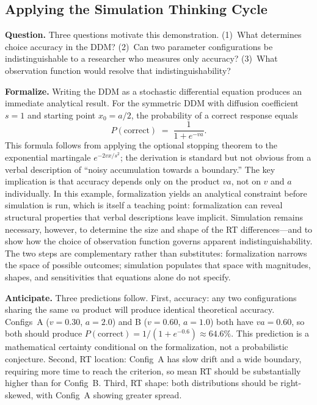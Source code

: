 \documentclass[11pt,a4paper]{article}
\begin{document}
\subsection*{Applying the Simulation Thinking Cycle}

\textbf{Question.} Three questions motivate this demonstration. (1)~What determines choice accuracy in the DDM? (2)~Can two parameter configurations be indistinguishable to a researcher who measures only accuracy? (3)~What observation function would resolve that indistinguishability?

\textbf{Formalize.} Writing the DDM as a stochastic differential equation produces an immediate analytical result. For the symmetric DDM with diffusion coefficient $s = 1$ and starting point $x_0 = a/2$, the probability of a correct response equals
\[
  P(\text{correct}) \;=\; \frac{1}{1 + e^{-va}}.
\]
This formula follows from applying the optional stopping theorem to the exponential martingale $e^{-2vx/s^2}$; the derivation is standard but not obvious from a verbal description of ``noisy accumulation towards a boundary.'' The key implication is that accuracy depends only on the product $va$, not on $v$ and $a$ individually. In this example, formalization yields an analytical constraint before simulation is run, which is itself a teaching point: formalization can reveal structural properties that verbal descriptions leave implicit. Simulation remains necessary, however, to determine the size and shape of the RT differences---and to show how the choice of observation function governs apparent indistinguishability. The two steps are complementary rather than substitutes: formalization narrows the space of possible outcomes; simulation populates that space with magnitudes, shapes, and sensitivities that equations alone do not specify.

\textbf{Anticipate.} Three predictions follow. First, accuracy: any two configurations sharing the same $va$ product will produce identical theoretical accuracy. Configs~A ($v = 0.30$, $a = 2.0$) and B ($v = 0.60$, $a = 1.0$) both have $va = 0.60$, so both should produce $P(\text{correct}) = 1/(1 + e^{-0.6}) \approx 64.6\%$. This prediction is a mathematical certainty conditional on the formalization, not a probabilistic conjecture. Second, RT location: Config~A has slow drift and a wide boundary, requiring more time to reach the criterion, so mean RT should be substantially higher than for Config~B. Third, RT shape: both distributions should be right-skewed, with Config~A showing greater spread.
\end{document}
